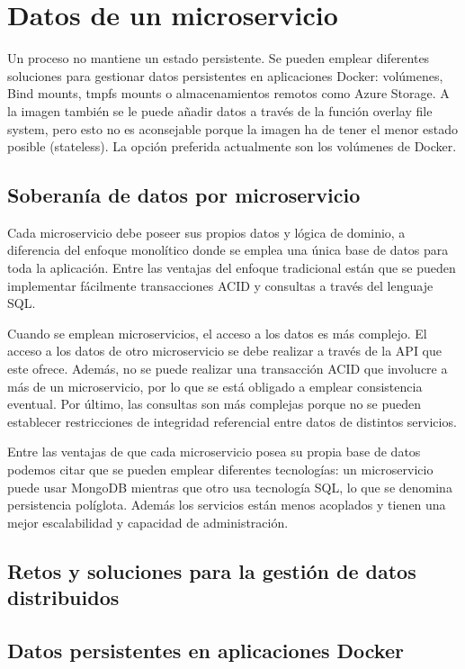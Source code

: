 \documentclass[11pt,a4paper]{article}
\begin{document}
\section{Datos de un microservicio}

Un proceso no mantiene un estado persistente. Se pueden emplear diferentes soluciones para gestionar datos persistentes en aplicaciones Docker: volúmenes, Bind mounts, tmpfs mounts o almacenamientos remotos como Azure Storage. A la imagen también se le puede añadir datos a través de la función overlay file system, pero esto no es aconsejable porque la imagen ha de tener el menor estado posible (stateless). La opción preferida actualmente son los volúmenes de Docker.

\subsection{Soberanía de datos por microservicio}

Cada microservicio debe poseer sus propios datos y lógica de dominio, a diferencia del enfoque monolítico donde se emplea una única base de datos para toda la aplicación. Entre las ventajas del enfoque tradicional están que se pueden implementar fácilmente transacciones ACID y consultas a través del lenguaje SQL.

Cuando se emplean microservicios, el acceso a los datos es más complejo. El acceso a los datos de otro microservicio se debe realizar a través de la API que este ofrece. Además, no se puede realizar una transacción ACID que involucre a más de un microservicio, por lo que se está obligado a emplear consistencia eventual. Por último, las consultas son más complejas porque no se pueden establecer restricciones de integridad referencial entre datos de distintos servicios.

Entre las ventajas de que cada microservicio posea su propia base de datos podemos citar que se pueden emplear diferentes tecnologías: un microservicio puede usar MongoDB mientras que otro usa tecnología SQL, lo que se denomina persistencia políglota. Además los servicios están menos acoplados y tienen una mejor escalabilidad y capacidad de administración.

\subsection{Retos y soluciones para la gestión de datos distribuidos}

\subsection{Datos persistentes en aplicaciones Docker}
\end{document}

